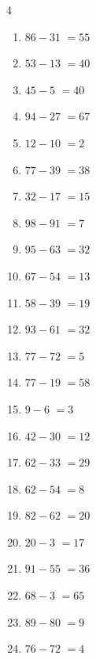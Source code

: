 \begin{multicols}{4}
\begin{enumerate}
  \item $86-31$
        $=55$

  \item $53-13$
        $=40$

  \item $45-5$
        $=40$

  \item $94-27$
        $=67$

  \item $12-10$
        $=2$

  \item $77-39$
        $=38$

  \item $32-17$
        $=15$

  \item $98-91$
        $=7$

  \item $95-63$
        $=32$

  \item $67-54$
        $=13$

  \item $58-39$
        $=19$

  \item $93-61$
        $=32$

  \item $77-72$
        $=5$

  \item $77-19$
        $=58$

  \item $9-6$
        $=3$

  \item $42-30$
        $=12$

  \item $62-33$
        $=29$

  \item $62-54$
        $=8$

  \item $82-62$
        $=20$

  \item $20-3$
        $=17$

  \item $91-55$
        $=36$

  \item $68-3$
        $=65$

  \item $89-80$
        $=9$

  \item $76-72$
        $=4$


\end{enumerate}
\end{multicols}
